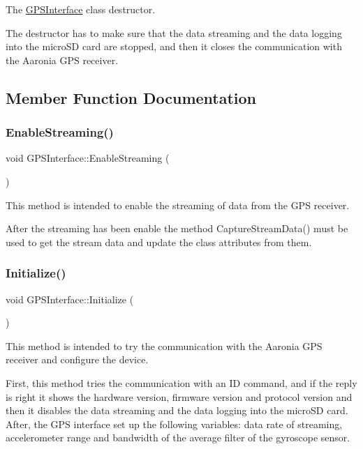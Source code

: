 The \hyperlink{classGPSInterface}{G\+P\+S\+Interface} class\textquotesingle{} destructor. 

The destructor has to make sure that the data streaming and the data logging into the micro\+SD card are stopped, and then it closes the communication with the Aaronia G\+PS receiver. 

\subsection{Member Function Documentation}
\mbox{\label{classGPSInterface_a9082fdd405532c59d4f085e62edc8ad7}} 
\subsubsection{\texorpdfstring{Enable\+Streaming()}{EnableStreaming()}}
{\footnotesize\ttfamily void G\+P\+S\+Interface\+::\+Enable\+Streaming (\begin{DoxyParamCaption}{ }\end{DoxyParamCaption})}



This method is intended to enable the streaming of data from the G\+PS receiver. 

After the streaming has been enable the method Capture\+Stream\+Data() must be used to get the stream data and update the class attributes from them. \mbox{\label{classGPSInterface_ac4a2712c98235f5ca2d826525180840b}} 
\subsubsection{\texorpdfstring{Initialize()}{Initialize()}}
{\footnotesize\ttfamily void G\+P\+S\+Interface\+::\+Initialize (\begin{DoxyParamCaption}{ }\end{DoxyParamCaption})}



This method is intended to try the communication with the Aaronia G\+PS receiver and configure the device. 

First, this method tries the communication with an ID command, and if the reply is right it shows the hardware version, firmware version and protocol version and then it disables the data streaming and the data logging into the micro\+SD card. After, the G\+PS interface set up the following variables\+: data rate of streaming, accelerometer range and bandwidth of the average filter of the gyroscope sensor. \mbox{\label{classGPSInterface_aa8f9b0517efbb5566a0a9220f23dd07a}} 
